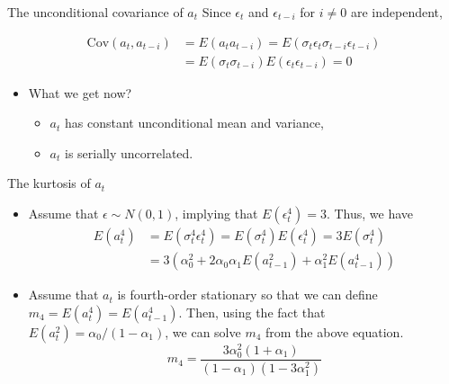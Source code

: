 \documentclass[presentation,10pt]{beamer}
\newcommand{\cov}{\mathrm{Cov}}
\begin{document}
\begin{frame}[label={sec:org8193a36}]{The unconditional covariance of \(a_t\)}
Since \(\epsilon_t\) and \(\epsilon_{t-i}\) for \(i \neq 0\) are independent, 

\begin{equation*}
\begin{split}
\cov(a_t, a_{t-i}) &= E(a_t a_{t-i}) = E(\sigma_t \epsilon_t \sigma_{t-i} \epsilon_{t-i}) \\
&= E(\sigma_t \sigma_{t-i}) E(\epsilon_t \epsilon_{t-i}) = 0
\end{split}
\end{equation*}

\begin{itemize}
\item What we get now?
\begin{itemize}
\item \(a_t\) has constant unconditional mean and variance,
\item \(a_t\) is serially uncorrelated.
\end{itemize}
\end{itemize}
\end{frame}

\begin{frame}[label={sec:org0c2fc8f}]{The kurtosis of \(a_t\)}
\begin{itemize}
\item Assume that \(\epsilon \sim N(0, 1)\), implying that \(E(\epsilon^4_t) =
  3\). Thus, we have
\begin{equation*}
\begin{split}
E(a^4_t) &= E(\sigma^4_t \epsilon_t^4) = E(\sigma^4_t) E(\epsilon^4_t) = 3 E(\sigma^4_t) \\
&= 3\left(\alpha^2_0 + 2\alpha_0\alpha_1 E(a^2_{t-1}) + \alpha^2_1 E(a^4_{t-1}) \right)
\end{split}
\end{equation*}

\item Assume that \(a_t\) is fourth-order stationary so that we can define
\(m_4 = E(a^4_t) = E(a^4_{t-1})\). Then, using the fact that \(E(a^2_t) =
  \alpha_0 /(1-\alpha_1)\), we can solve \(m_4\) from the
above equation.
\[m_4 = \frac{3\alpha^2_0(1+\alpha_1)}{(1-\alpha_1)(1-3\alpha^2_1)}
  \]
\end{itemize}
\end{frame}
\end{document}
